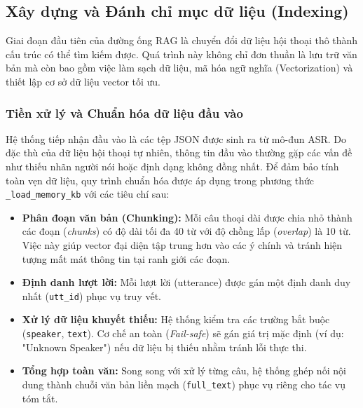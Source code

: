 \subsection{Xây dựng và Đánh chỉ mục dữ liệu (Indexing)}
\label{subsec:indexing}

Giai đoạn đầu tiên của đường ống RAG là chuyển đổi dữ liệu hội thoại thô thành cấu trúc có thể tìm kiếm được. Quá trình này không chỉ đơn thuần là lưu trữ văn bản mà còn bao gồm việc làm sạch dữ liệu, mã hóa ngữ nghĩa (Vectorization) và thiết lập cơ sở dữ liệu vector tối ưu.

\subsubsection{Tiền xử lý và Chuẩn hóa dữ liệu đầu vào}
Hệ thống tiếp nhận đầu vào là các tệp JSON được sinh ra từ mô-đun ASR. Do đặc thù của dữ liệu hội thoại tự nhiên, thông tin đầu vào thường gặp các vấn đề như thiếu nhãn người nói hoặc định dạng không đồng nhất. Để đảm bảo tính toàn vẹn dữ liệu, quy trình chuẩn hóa được áp dụng trong phương thức \texttt{\_load\_memory\_kb} với các tiêu chí sau:

\begin{itemize}
    \item \textbf{Phân đoạn văn bản (Chunking):} Mỗi câu thoại dài được chia nhỏ thành các đoạn (\textit{chunks}) có độ dài tối đa 40 từ với độ chồng lấp (\textit{overlap}) là 10 từ. Việc này giúp vector đại diện tập trung hơn vào các ý chính và tránh hiện tượng mất mát thông tin tại ranh giới các đoạn.
    \item \textbf{Định danh lượt lời:} Mỗi lượt lời (utterance) được gán một định danh duy nhất (\texttt{utt\_id}) phục vụ truy vết.
    \item \textbf{Xử lý dữ liệu khuyết thiếu:} Hệ thống kiểm tra các trường bắt buộc (\texttt{speaker}, \texttt{text}). Cơ chế an toàn (\textit{Fail-safe}) sẽ gán giá trị mặc định (ví dụ: "Unknown Speaker") nếu dữ liệu bị thiếu nhằm tránh lỗi thực thi.
    \item \textbf{Tổng hợp toàn văn:} Song song với xử lý từng câu, hệ thống ghép nối nội dung thành chuỗi văn bản liền mạch (\texttt{full\_text}) phục vụ riêng cho tác vụ tóm tắt.
\end{itemize}

